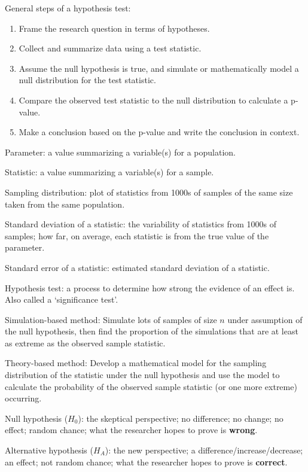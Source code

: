 \documentclass[
]{report}
\begin{document}
General steps of a hypothesis test:

\begin{enumerate}
\def\labelenumi{\arabic{enumi}.}
\item
  Frame the research question in terms of hypotheses.
\item
  Collect and summarize data using a test statistic.
\item
  Assume the null hypothesis is true, and simulate or mathematically model a null distribution for the test statistic.
\item
  Compare the observed test statistic to the null distribution to calculate a p-value.
\item
  Make a conclusion based on the p-value and write the conclusion in context.
\end{enumerate}

Parameter: a value summarizing a variable(s) for a population.

Statistic: a value summarizing a variable(s) for a sample.

Sampling distribution: plot of statistics from 1000s of samples of the same size taken from the same population.

Standard deviation of a statistic: the variability of statistics from 1000s of samples; how far, on average, each statistic is from the true value of the parameter.

Standard error of a statistic: estimated standard deviation of a statistic.

Hypothesis test: a process to determine how strong the evidence of an effect is. Also called a `significance test'.

Simulation-based method: Simulate lots of samples of size \(n\) under assumption of the null hypothesis, then find the proportion of the simulations that are at least as extreme as the observed sample statistic.

Theory-based method: Develop a mathematical model for the sampling distribution of the statistic under the null hypothesis and use the model to calculate the probability of the observed sample statistic (or one more extreme) occurring.

Null hypothesis (\(H_0\)): the skeptical perspective; no difference; no change; no effect; random chance; what the researcher hopes to prove is \textbf{wrong}.

Alternative hypothesis (\(H_A\)): the new perspective; a difference/increase/decrease; an effect; not random chance; what the researcher hopes to prove is \textbf{correct}.
\end{document}
